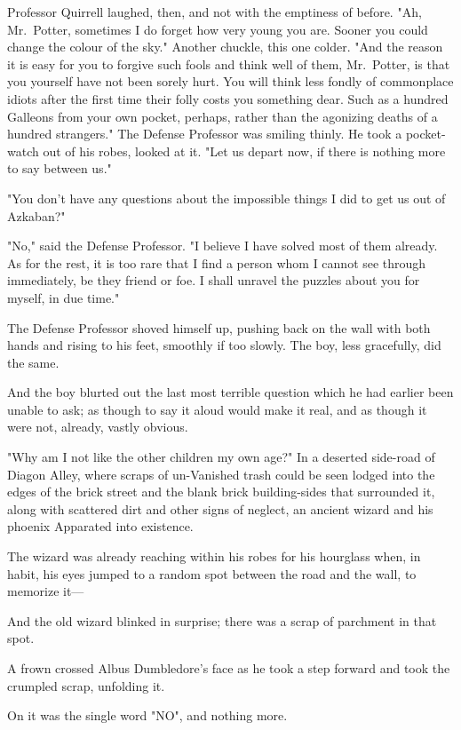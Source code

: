 Professor Quirrell laughed, then, and not with the emptiness of before. "Ah,
Mr.~Potter, sometimes I do forget how very young you are. Sooner you could
change the colour of the sky." Another chuckle, this one colder. "And the reason
it is easy for you to forgive such fools and think well of them, Mr.~Potter, is
that you yourself have not been sorely hurt. You will think less fondly of
commonplace idiots after the first time their folly costs you something dear.
Such as a hundred Galleons from your own pocket, perhaps, rather than the
agonizing deaths of a hundred strangers." The Defense Professor was smiling
thinly. He took a pocket-watch out of his robes, looked at it. "Let us depart
now, if there is nothing more to say between us."

"You don't have any questions about the impossible things I did to get us out
of Azkaban?"

"No," said the Defense Professor. "I believe I have solved most of them
already. As for the rest, it is too rare that I find a person whom I cannot see
through immediately, be they friend or foe. I shall unravel the puzzles about
you for myself, in due time."

The Defense Professor shoved himself up, pushing back on the wall with both
hands and rising to his feet, smoothly if too slowly. The boy, less gracefully,
did the same.

And the boy blurted out the last most terrible question which he had earlier
been unable to ask; as though to say it aloud would make it real, and as though
it were not, already, vastly obvious.

"Why am I not like the other children my own age?"
\later
In a deserted side-road of Diagon Alley, where scraps of un-Vanished trash
could be seen lodged into the edges of the brick street and the blank brick
building-sides that surrounded it, along with scattered dirt and other signs of
neglect, an ancient wizard and his phoenix Apparated into existence.

The wizard was already reaching within his robes for his hourglass when, in
habit, his eyes jumped to a random spot between the road and the wall, to
memorize it---

And the old wizard blinked in surprise; there was a scrap of parchment in that
spot.

A frown crossed Albus Dumbledore's face as he took a step forward and took the
crumpled scrap, unfolding it.

On it was the single word "NO", and nothing more.

